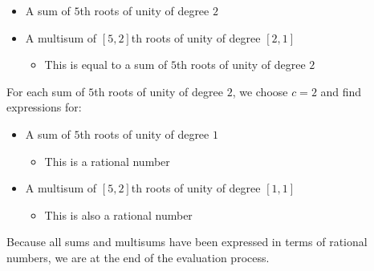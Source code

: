 \documentclass{article}
\begin{document}
        \begin{itemize}
            \item A sum of $ 5 $th roots of unity of degree $ 2 $
            \item A multisum of $ [5, 2] $th roots of unity of degree $ [2, 1] $
            \begin{itemize}
                \item This is equal to a sum of $ 5 $th roots of unity of degree $ 2 $
            \end{itemize}
        \end{itemize}
        For each sum of $ 5 $th roots of unity of degree $ 2 $, we choose $ c = 2 $ and find expressions for:
        \begin{itemize}
            \item A sum of $ 5 $th roots of unity of degree $ 1 $
            \begin{itemize}
                \item This is a rational number
            \end{itemize}
            \item A multisum of $ [5, 2] $th roots of unity of degree $ [1, 1] $
            \begin{itemize}
                \item This is also a rational number
            \end{itemize}
        \end{itemize}
        Because all sums and multisums have been expressed in terms of rational numbers, we are at the end of the evaluation process.\\
\end{document}
